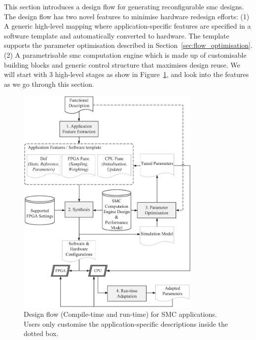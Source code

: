 This section introduces a design flow for generating reconfigurable \gls{smc} 
designs. The design flow has two novel features to minimise hardware redesign efforts:
(1) A generic high-level mapping where application-specific features are specified in a software template and automatically converted to hardware.
The template supports the parameter optimisation described in Section~\ref{sec:flow_optimisation}.
(2) A parametrisable \gls{smc} computation engine which is made up of customisable building blocks and generic control structure that maximises design reuse.
We will start with 3 high-level stages as show in Figure~\ref{fig:flow}, and look into the features as we go through this section.

\begin{figure}[ht]
\begin{center}
\includegraphics[width=0.8\textwidth]{5_tool/figures/flow}
\end{center}
\caption{Design flow (Compile-time and run-time) for SMC applications. Users only customise the application-specific descriptions inside the dotted box.}
\label{fig:flow}
\end{figure}

